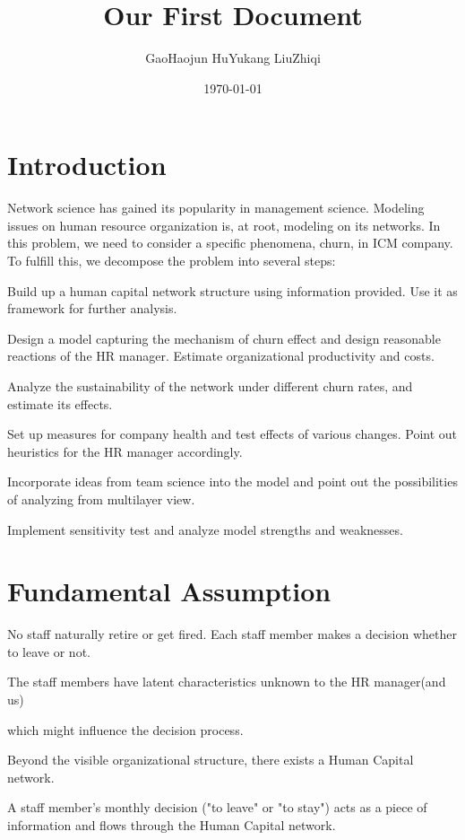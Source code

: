 \documentclass[10pt]{article}
\title{Our First Document}
\author{GaoHaojun HuYukang LiuZhiqi}
\date{\today}
\begin{document}
  \maketitle
  \tableofcontents

  \section{Introduction}

  Network science has gained its popularity in management science. Modeling issues on   human resource organization is, at root, modeling on its networks. In this problem, we need to consider a specific phenomena, churn, in ICM company. To fulfill this, we decompose the problem into several steps:

  Build up a human capital network structure using information provided. Use it as framework for further analysis.

  Design a model capturing the mechanism of churn effect and design reasonable reactions of the HR manager. Estimate organizational productivity and costs.

  Analyze the sustainability of the network under different churn rates, and estimate its effects.

  Set up measures for company health and test effects of various changes. Point out heuristics for the HR manager accordingly.

  Incorporate ideas from team science into the model and point out the possibilities of analyzing from multilayer view.

  Implement sensitivity test and analyze model strengths and weaknesses.

  \section{Fundamental Assumption}

  No staff naturally retire or get fired. Each staff member makes a decision whether to leave or not.

  The staff members have latent characteristics unknown to the HR manager(and us)

  which might influence the decision process.

  Beyond the visible organizational structure, there exists a Human Capital network.

  A staff member’s monthly decision ("to leave" or "to stay") acts as a piece of information and flows through the Human Capital network.
\end{document}
